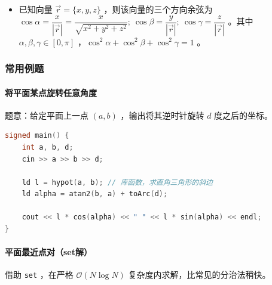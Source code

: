 \begin{itemize}
\tightlist
\item
  已知向量 \(\vec{r}=\{x,y,z\}\) ，则该向量的三个方向余弦为 \(\cos \alpha =\dfrac{x}{|\vec r|}=\dfrac{x}{\sqrt{x^2+y^2+z^2}}; \ \cos \beta = \dfrac{y}{|\vec r|};\ \cos \gamma =\dfrac{z}{|\vec r|}\) 。其中 \(\alpha,\beta,\gamma\in [0,\pi]\) ，\(\cos^2\alpha+\cos^2\beta+\cos^2\gamma=1\) 。
\end{itemize}

\hypertarget{ux5e38ux7528ux4f8bux9898}{%
\subsubsection{常用例题}\label{ux5e38ux7528ux4f8bux9898}}

\hypertarget{ux5c06ux5e73ux9762ux67d0ux70b9ux65cbux8f6cux4efbux610fux89d2ux5ea6}{%
\paragraph{将平面某点旋转任意角度}\label{ux5c06ux5e73ux9762ux67d0ux70b9ux65cbux8f6cux4efbux610fux89d2ux5ea6}}

题意：给定平面上一点 \((a,b)\) ，输出将其逆时针旋转 \(d\) 度之后的坐标。

\begin{lstlisting}[language={C++}]
signed main() {
    int a, b, d;
    cin >> a >> b >> d;
    
    ld l = hypot(a, b); // 库函数，求直角三角形的斜边
    ld alpha = atan2(b, a) + toArc(d);
    
    cout << l * cos(alpha) << " " << l * sin(alpha) << endl;
}
\end{lstlisting}

\hypertarget{ux5e73ux9762ux6700ux8fd1ux70b9ux5bf9setux89e3}{%
\paragraph{平面最近点对（set解）}\label{ux5e73ux9762ux6700ux8fd1ux70b9ux5bf9setux89e3}}

借助 \passthrough{\lstinline!set!} ，在严格 \(\mathcal O(N\log N)\) 复杂度内求解，比常见的分治法稍快。

